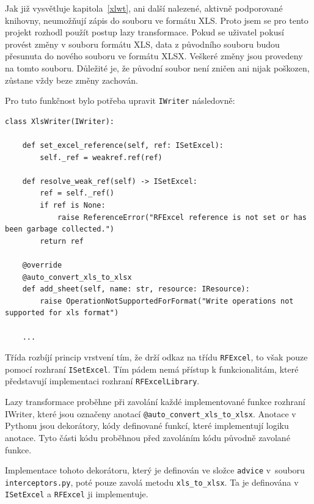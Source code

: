 Jak již vysvětluje kapitola~\ref{xlwt}, ani další nalezené, aktivně podporované knihovny, neumožňují zápis do souboru ve formátu XLS. Proto jsem se pro tento projekt rozhodl použít postup lazy transformace. Pokud se uživatel pokusí provést změny v souboru formátu XLS, data z původního souboru budou přesunuta do nového souboru ve formátu XLSX. Veškeré změny jsou provedeny na tomto souboru. Důležité je, že původní soubor není zničen ani nijak poškozen, zůstane vždy beze změny zachován.

Pro tuto funkčnost bylo potřeba upravit \texttt{IWriter} následovně:

\begin{listing}[H]
    \begin{verbatim}
class XlsWriter(IWriter):

    def set_excel_reference(self, ref: ISetExcel):
        self._ref = weakref.ref(ref)

    def resolve_weak_ref(self) -> ISetExcel:
        ref = self._ref()
        if ref is None:
            raise ReferenceError("RFExcel reference is not set or has been garbage collected.")
        return ref

    @override
    @auto_convert_xls_to_xlsx
    def add_sheet(self, name: str, resource: IResource):
        raise OperationNotSupportedForFormat("Write operations not supported for xls format")

    ...
    \end{verbatim}
    
    \caption{Implementace lazy transformace - vlastní tvorba}
    \label{list:demo-library}
\end{listing}

Třída rozbíjí princip  vrstvení tím, že drží odkaz na třídu \texttt{RFExcel}, to však pouze pomocí rozhraní \texttt{ISetExcel}. Tím pádem nemá přístup k funkcionalitám, které představují implementaci rozhraní \texttt{RFExcelLibrary}.

Lazy transformace proběhne při zavolání každé implementované funkce rozhraní IWriter, které jsou označeny anotací \texttt{@auto\_convert\_xls\_to\_xlsx}. Anotace v Pythonu jsou dekorátory, kódy definované funkcí, které implementují logiku anotace. Tyto části kódu proběhnou před zavoláním kódu původně zavolané funkce.

Implementace tohoto dekorátoru, který je definován ve složce \texttt{advice} v~souboru \texttt{interceptors.py}, poté pouze zavolá metodu \texttt{xls\_to\_xlsx}. Ta je definována v \texttt{ISetExcel} a \texttt{RFExcel} ji implementuje.

